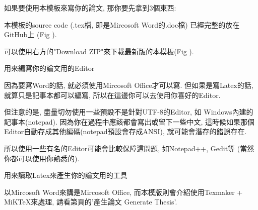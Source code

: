 
如果要使用本模板來寫你的論文, 那你要先拿到3個東西:


本模板的source code (.tex檔, 即是Mircosoft Word的.doc檔) 已經完整的放在GitHub上 (Fig ).


可以使用右方的"Download ZIP"來下載最新版的本模板(Fig ).


用來編寫你的論文用的Editor

因為要寫Word的話, 就必須使用Mircosoft Office才可以寫. 但如果是寫Latex的話, 就算只是記事本都可以編寫, 所以在這邊你可以去使用你喜好的Editor.

但注意的是, 盡量切勿使用一些預設不是針對UTF-8的Editor, 如 Windows內建的記事本(notepad). 因為你在過程中應該都會寫出或留下一些中文, 這時候如果那個Editor自動存成其他編碼(notepad預設會存成ANSI), 就可能會潛存的錯誤存在.

所以使用一些有名的Editor可能會比較保障這問題, 如Notepad++, Gedit等 (當然你都可以使用你熟悉的).



用來讀取Latex來產生你的論文用的工具

以Mircosoft Word來講是Mircosoft Office, 而本模版則會介紹使用Texmaker + MiKTeX來處理, 請看第頁的'產生論文 Generate Thesis'.

